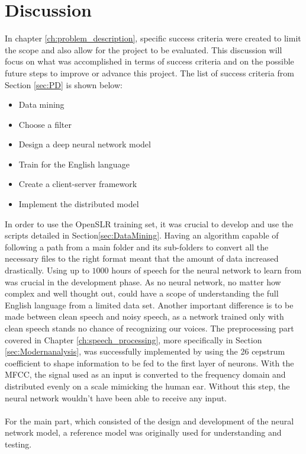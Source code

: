 \chapter{Discussion}\label{ch:discussion}
In chapter \ref{ch:problem_description},
specific success criteria were created to
limit the scope and also allow for the project to be 
evaluated. 
This discussion will focus on what was accomplished
in terms of success criteria and on the possible
future steps to improve or advance this project.
The list of success criteria from Section \ref{sec:PD} 
is shown below:
\begin{itemize}
    \item Data mining
    \item Choose a filter
    \item Design a deep neural network model
    \item Train for the English language
    \item Create a client-server framework
    \item Implement the distributed model
\end{itemize} 
In order to use the OpenSLR training set,
it was crucial to develop and use the scripts
detailed in Section\ref{sec:DataMining}.
Having an algorithm capable of following a path
from a main folder and its sub-folders to
convert all the necessary files to the right
format meant that the amount of data increased drastically.
Using up to $1000$ hours of speech for the neural
network to learn from was crucial in the development
phase.
As no neural network, no matter how complex and
well thought out, could have a scope of
understanding the full English language from a
limited data set. 
Another important difference is to be made between
clean speech and noisy speech, as a network
trained only with clean speech stands no chance
of recognizing our voices.
The preprocessing part covered in Chapter 
\ref{ch:speech_processing}, more specifically in Section 
\ref{sec:Modernanalysis}, was successfully implemented 
by using the 26 cepstrum coefficient to shape 
information to be fed to the first layer of neurons. 
With the MFCC, the signal used as an input is converted 
to the frequency domain and distributed evenly on a 
scale mimicking the human ear. Without this step, the 
neural network wouldn't have been able to
receive any input.\\\\
For the main part, which consisted of the design and 
development of the neural network model, a reference 
model was originally used for understanding and testing. 
